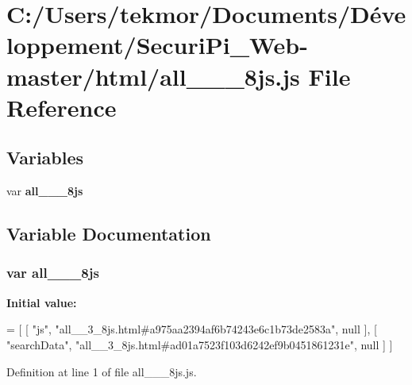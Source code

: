 \section{C\+:/\+Users/tekmor/\+Documents/\+Développement/\+Securi\+Pi\+\_\+\+Web-\/master/html/all\+\_\+\+\_\+\_\+8js.js File Reference}
\label{all____3__8js_8js}
\subsection*{Variables}
\begin{DoxyCompactItemize}
\item 
var {\bf all\+\_\+\+\_\+\_\+8js}
\end{DoxyCompactItemize}


\subsection{Variable Documentation}
\subsubsection[{all\+\_\+\+\_\+3\+\_\+8js}]{\setlength{\rightskip}{0pt plus 5cm}var all\+\_\+\+\_\+\_\+8js}\label{all____3__8js_8js_ae90c7cd3be90f412c61b119feaedefa5}
{\bfseries Initial value\+:}
\begin{DoxyCode}
=
[
    [ \textcolor{stringliteral}{"js"}, \textcolor{stringliteral}{"all\_\_3\_8js.html#a975aa2394af6b74243e6c1b73de2583a"}, null ],
    [ \textcolor{stringliteral}{"searchData"}, \textcolor{stringliteral}{"all\_\_3\_8js.html#ad01a7523f103d6242ef9b0451861231e"}, null ]
]
\end{DoxyCode}


Definition at line 1 of file all\+\_\+\+\_\+\_\+8js.\+js.

